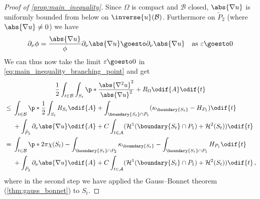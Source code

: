 \documentclass[titlepage,numbers=noenddot,oneside,%
cleardoublepage=empty,paper=a4,fontsize=11pt,%
english,%
]{scrartcl}
\newcommand*{\mathcomma}{\,,}
\begin{document}
{\begin{proof}[Proof of \cref{prop:main_inequality}]
    Since \( \Omega \) is compact and \( \mathcal{B} \) closed, \( \abs{\nabla u} \) is uniformly bounded from below on \( \inverse{u}(\mathcal{B}) \). Furthermore on \( \tilde{P}_2 \) (where \( \abs{\nabla u}\neq 0 \)) we have
    \begin{equation*}
        \partial_\nu \phi=\frac{\abs{\nabla u}}{\phi}\partial_{\nu}\abs{\nabla u}\goesto \partial_{\nu}\abs{\nabla u}\quad \text{as \( \varepsilon\goesto 0 \)}
    \end{equation*} 
    We can thus now take the limit \( \varepsilon\goesto 0 \) in \cref{eq:main_inequality_branching_point} and get
    \begin{multline}
        \frac{1}{2}\int_{t\in \mathcal{B}}\int_{S_t}\p*{\frac{\abs{\nabla^2 u}^2}{\abs{\nabla u}^2}+R_{\Omega}}\odif{A}\odif{t}\\
        \begin{aligned}[t]&\leq 
            \begin{aligned}[t]
                &\int_{t\in \mathcal{B}}\p*{\frac{1}{2}\int_{S_t}R_{S_t}\odif{A}+\int_{\boundary{S_t}\cap P_1}(\kappa_{\boundary{S_t}}-H_{P_1})} \odif{t}\\
                &+\int_{\tilde{P}_2}\partial_{\nu}\abs{\nabla u}\odif{A}+C\int_{t\in \mathcal{A}}(\mathcal{H}^1(\boundary{S_t}\cap P_1)+\mathcal{H}^2(S_t))\odif{t}
            \end{aligned}\\
            &=\begin{aligned}[t]
            &\int_{t\in \mathcal{B}}\p*{2\pi \chi(S_t)-\int_{\boundary{S_t}\cap P_2}\kappa_{\boundary{S_t}}-\int_{\boundary{S_t}\cap P_1}H_{P_1}} \odif{t}\\
            &+\int_{\tilde{P}_2}\partial_{\nu}\abs{\nabla u}\odif{A}+C\int_{t\in \mathcal{A}}(\mathcal{H}^1(\boundary{S_t}\cap P_1)+\mathcal{H}^2(S_t))\odif{t}\mathcomma
        \end{aligned}
        \end{aligned} \label{eq:inequality_with_critical_values_removed}
    \end{multline}
    where in the second step we have applied the Gauss--Bonnet theorem (\cref{thm:gauss_bonnet}) to \( S_t \).
    


\end{proof}}
\end{document}
